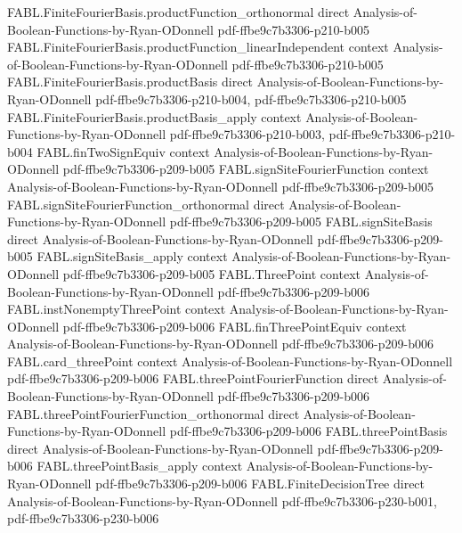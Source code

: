 \begin{theorem}
  {FABL.FiniteFourierBasis.productFunction_orthonormal}
  {direct}
  {Analysis-of-Boolean-Functions-by-Ryan-ODonnell}
  {pdf-ffbe9c7b3306-p210-b005}
\proofstep
  {FABL.FiniteFourierBasis.productFunction_linearIndependent}
  {context}
  {Analysis-of-Boolean-Functions-by-Ryan-ODonnell}
  {pdf-ffbe9c7b3306-p210-b005}
\proofstep
  {FABL.FiniteFourierBasis.productBasis}
  {direct}
  {Analysis-of-Boolean-Functions-by-Ryan-ODonnell}
  {pdf-ffbe9c7b3306-p210-b004,
    pdf-ffbe9c7b3306-p210-b005}
\proofstep
  {FABL.FiniteFourierBasis.productBasis_apply}
  {context}
  {Analysis-of-Boolean-Functions-by-Ryan-ODonnell}
  {pdf-ffbe9c7b3306-p210-b003,
    pdf-ffbe9c7b3306-p210-b004}
\proofstep
  {FABL.finTwoSignEquiv}
  {context}
  {Analysis-of-Boolean-Functions-by-Ryan-ODonnell}
  {pdf-ffbe9c7b3306-p209-b005}
\proofstep
  {FABL.signSiteFourierFunction}
  {context}
  {Analysis-of-Boolean-Functions-by-Ryan-ODonnell}
  {pdf-ffbe9c7b3306-p209-b005}
\proofstep
  {FABL.signSiteFourierFunction_orthonormal}
  {direct}
  {Analysis-of-Boolean-Functions-by-Ryan-ODonnell}
  {pdf-ffbe9c7b3306-p209-b005}
\proofstep
  {FABL.signSiteBasis}
  {direct}
  {Analysis-of-Boolean-Functions-by-Ryan-ODonnell}
  {pdf-ffbe9c7b3306-p209-b005}
\proofstep
  {FABL.signSiteBasis_apply}
  {context}
  {Analysis-of-Boolean-Functions-by-Ryan-ODonnell}
  {pdf-ffbe9c7b3306-p209-b005}
\proofstep
  {FABL.ThreePoint}
  {context}
  {Analysis-of-Boolean-Functions-by-Ryan-ODonnell}
  {pdf-ffbe9c7b3306-p209-b006}
\proofstep
  {FABL.instNonemptyThreePoint}
  {context}
  {Analysis-of-Boolean-Functions-by-Ryan-ODonnell}
  {pdf-ffbe9c7b3306-p209-b006}
\proofstep
  {FABL.finThreePointEquiv}
  {context}
  {Analysis-of-Boolean-Functions-by-Ryan-ODonnell}
  {pdf-ffbe9c7b3306-p209-b006}
\proofstep
  {FABL.card_threePoint}
  {context}
  {Analysis-of-Boolean-Functions-by-Ryan-ODonnell}
  {pdf-ffbe9c7b3306-p209-b006}
\proofstep
  {FABL.threePointFourierFunction}
  {direct}
  {Analysis-of-Boolean-Functions-by-Ryan-ODonnell}
  {pdf-ffbe9c7b3306-p209-b006}
\proofstep
  {FABL.threePointFourierFunction_orthonormal}
  {direct}
  {Analysis-of-Boolean-Functions-by-Ryan-ODonnell}
  {pdf-ffbe9c7b3306-p209-b006}
\proofstep
  {FABL.threePointBasis}
  {direct}
  {Analysis-of-Boolean-Functions-by-Ryan-ODonnell}
  {pdf-ffbe9c7b3306-p209-b006}
\proofstep
  {FABL.threePointBasis_apply}
  {context}
  {Analysis-of-Boolean-Functions-by-Ryan-ODonnell}
  {pdf-ffbe9c7b3306-p209-b006}
\proofstep
  {FABL.FiniteDecisionTree}
  {direct}
  {Analysis-of-Boolean-Functions-by-Ryan-ODonnell}
  {pdf-ffbe9c7b3306-p230-b001,
    pdf-ffbe9c7b3306-p230-b006}
\proofstep

\end{theorem}

